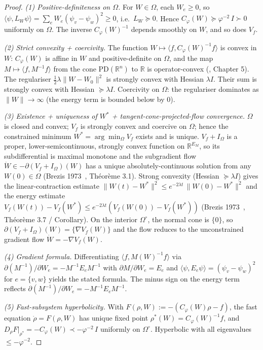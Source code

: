 \documentclass[11pt]{article}
\theoremstyle{definition}
\newcommand{\R}{\mathbb{R}}
\begin{document}
\begin{proof}[Proof]
\emph{(1) Positive-definiteness on $\Omega$.}
For $W \in \Omega$, each $W_e \geq 0$, so $\langle\psi, L_W \psi\rangle = \sum_e W_e (\psi_v - \psi_w)^2 \geq 0$, i.e.\ $L_W \succeq 0$. Hence $C_\varphi(W) \succeq \varphi^{-2}\, I \succ 0$ uniformly on $\Omega$. The inverse $C_\varphi(W)^{-1}$ depends smoothly on $W$, and so does $V_f$.

\emph{(2) Strict convexity + coercivity.}
The function $W \mapsto \langle f, C_\varphi(W)^{-1} f\rangle$ is convex in $W$: $C_\varphi(W)$ is affine in $W$ and positive-definite on $\Omega$, and the map $M \mapsto \langle f, M^{-1} f\rangle$ from the cone $\mathrm{PD}(\R^n)$ to $\R$ is operator-convex (\citep{Bhatia2007}, Chapter 5). The regulariser $\tfrac{1}{2}\lambda\|W - W_0\|^2$ is strongly convex with Hessian $\lambda I$. Their sum is strongly convex with Hessian $\succeq \lambda I$. Coercivity on $\Omega$: the regulariser dominates as $\|W\| \to \infty$ (the energy term is bounded below by $0$).

\emph{(3) Existence + uniqueness of $W^*$ + tangent-cone-projected-flow convergence.}
$\Omega$ is closed and convex; $V_f$ is strongly convex and coercive on $\Omega$; hence the constrained minimum $W^* = \arg\min_\Omega V_f$ exists and is unique. $V_f + I_\Omega$ is a proper, lower-semicontinuous, strongly convex function on $\R^{E_M}$, so its subdifferential is maximal monotone and the subgradient flow $\dot W \in -\partial(V_f + I_\Omega)(W)$ has a unique absolutely-continuous solution from any $W(0) \in \Omega$ (Brezis 1973~\citep{Brezis1973}, Théorème 3.1). Strong convexity (Hessian $\succeq \lambda I$) gives the linear-contraction estimate $\|W(t) - W^*\|^2 \leq e^{-2\lambda t}\,\|W(0) - W^*\|^2$ and the energy estimate $V_f(W(t)) - V_f(W^*) \leq e^{-2\lambda t}(V_f(W(0)) - V_f(W^*))$ (Brezis 1973~\citep{Brezis1973}, Théorème 3.7 / Corollary). On the interior $\Omega^\circ$, the normal cone is $\{0\}$, so $\partial(V_f + I_\Omega)(W) = \{\nabla V_f(W)\}$ and the flow reduces to the unconstrained gradient flow $\dot W = -\nabla V_f(W)$.

\emph{(4) Gradient formula.}
Differentiating $\langle f, M(W)^{-1} f\rangle$ via $\partial(M^{-1})/\partial W_e = -M^{-1} E_e M^{-1}$ with $\partial M/\partial W_e = E_e$ and $\langle\psi, E_e \psi\rangle = (\psi_v - \psi_w)^2$ for $e = \{v,w\}$ yields the stated formula. The minus sign on the energy term reflects $\partial(M^{-1})/\partial W_e = -M^{-1} E_e M^{-1}$.

\emph{(5) Fast-subsystem hyperbolicity.}
With $F(\rho, W) := -(C_\varphi(W)\rho - f)$, the fast equation $\dot\rho = F(\rho, W)$ has unique fixed point $\rho^*(W) = C_\varphi(W)^{-1}f$, and $D_\rho F|_{\rho^*} = -C_\varphi(W) \prec -\varphi^{-2}\, I$ uniformly on $\Omega^\circ$. Hyperbolic with all eigenvalues $\leq -\varphi^{-2}$.


\end{proof}
\end{document}
